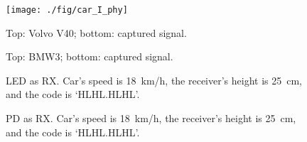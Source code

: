 \documentclass[10pt]{sig-alternate-05-2015}
\begin{document}
{\begin{figure}[t!]
	\begin{minipage}[b]{.485\columnwidth}
		\centering
		\subfigure
		{\texttt{[image: ./fig/car\_I\_phy]}}
		\vspace{-3mm}
		\caption{Top: Volvo V40; \newline bottom: captured signal.}
		\vspace{-2mm}
		\label{fig_car_volvo_v40}
	\end{minipage} 
	\hfill
	\begin{minipage}[b]{.485\columnwidth}
		\centering
		\vspace{-3mm}
		\caption{Top: BMW3; \newline bottom: captured signal. }
		\vspace{-2mm}
		\label{fig_car_bmw_3}
	\end{minipage} 
\end{figure}

\begin{figure}[t]
	\hfill
	\vspace{-2mm}
	\caption {LED as RX. Car's speed is 18~km/h, the receiver's height is 25~cm, and the code is `HLHL.HLHL'.}
	\vspace{-2mm}
	\label{fig_d25cmLED}
\end{figure}

\begin{figure}[t!]
	\hfill
	\vspace{-2mm}
	\caption {PD as RX. Car's speed is 18~km/h, the receiver's height is 25~cm, and the code is `HLHL.HLHL'.}
	\vspace{-2mm}
	\label{fig_d25cmPD}
\end{figure}

}
\end{document}
